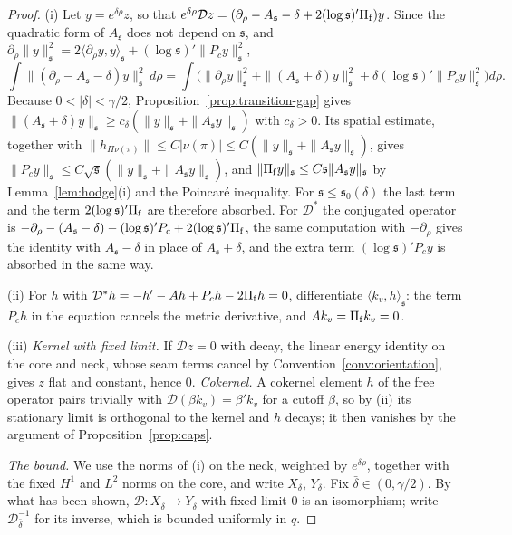 \documentclass[11pt]{amsart}
\theoremstyle{definition}
\theoremstyle{remark}
\theoremstyle{plain}
\numberwithin{equation}{section}
\begin{document}
\begin{proof}
(i) Let $y=e^{\delta\rho}z$, so that
$e^{\delta\rho}\mathcal Dz=(\partial_\rho-A_{\mathfrak s}-\delta+2(\log{\mathfrak s})'\Pi_{\rm f})y$. Since the
quadratic form of $A_{\mathfrak s}$ does not depend on ${\mathfrak s}$, and
$\partial_\rho\|y\|_{\mathfrak s}^2=2\langle\partial_\rho y,y\rangle_{\mathfrak s}+(\log{\mathfrak s})'\|P_cy\|_{\mathfrak s}^2$,
\[
\int\|(\partial_\rho-A_{\mathfrak s}-\delta)y\|_{\mathfrak s}^2\,d\rho
=\int\bigl(\|\partial_\rho y\|_{\mathfrak s}^2+\|(A_{\mathfrak s}+\delta)y\|_{\mathfrak s}^2
+\delta(\log{\mathfrak s})'\|P_cy\|_{\mathfrak s}^2\bigr)d\rho .
\]
Because $0<|\delta|<\gamma/2$, Proposition~\ref{prop:transition-gap} gives
$\|(A_{\mathfrak s}+\delta)y\|_{\mathfrak s}\ge c_\delta(\|y\|_{\mathfrak s}+\|A_{\mathfrak s} y\|_{\mathfrak s})$ with $c_\delta>0$.
Its spatial estimate, together with $\|h_{\Pi\nu(\pi)}\|\le C|\nu(\pi)|\le
C(\|y\|_{\mathfrak s}+\|A_{\mathfrak s} y\|_{\mathfrak s})$, gives $\|P_cy\|_{\mathfrak s}\le
C\sqrt{\mathfrak s}(\|y\|_{\mathfrak s}+\|A_{\mathfrak s} y\|_{\mathfrak s})$, and $\|\Pi_{\rm f}y\|_{\mathfrak s}\le C{\mathfrak s}\|A_{\mathfrak s} y\|_{\mathfrak s}$
by Lemma~\ref{lem:hodge}(i) and the Poincaré inequality. For ${\mathfrak s}\le{\mathfrak s}_0(\delta)$ the last term and the term $2(\log{\mathfrak s})'\Pi_{\rm f}$ are therefore absorbed. For $\mathcal D^*$ the conjugated
operator is $-\partial_\rho-(A_{\mathfrak s}-\delta)-(\log{\mathfrak s})'P_c+2(\log{\mathfrak s})'\Pi_{\rm f}$, the same
computation with $-\partial_\rho$ gives the identity with $A_{\mathfrak s}-\delta$ in place of
$A_{\mathfrak s}+\delta$, and the extra term $(\log{\mathfrak s})'P_cy$ is absorbed in the same way.

(ii) For $h$ with $\mathcal D^*h=-h'-Ah+P_ch-2\Pi_{\rm f}h=0$, differentiate
$\langle k_v,h\rangle_{\mathfrak s}$: the term $P_ch$ in the equation cancels the metric
derivative, and $Ak_v=\Pi_{\rm f}k_v=0$.

(iii) \emph{Kernel with fixed limit.} If $\mathcal Dz=0$ with decay, the linear
energy identity on the core and neck, whose seam terms cancel by
Convention~\ref{conv:orientation}, gives $z$ flat and constant, hence $0$.
\emph{Cokernel.} A cokernel element $h$ of the free operator pairs trivially
with $\mathcal D(\beta k_v)=\beta'k_v$ for a cutoff $\beta$, so by (ii) its stationary
limit is orthogonal to the kernel and $h$ decays; it then vanishes by the
argument of Proposition~\ref{prop:caps}. 

\emph{The bound.} We use the norms of (i) on the neck, weighted by $e^{\delta\rho}$,
together with the fixed $H^1$ and $L^2$ norms on the core, and write $X_\delta$,
$Y_\delta$. Fix $\bar\delta\in(0,\gamma/2)$. By what has been shown, $\mathcal D\colon
X_{\bar\delta}\to Y_{\bar\delta}$ with fixed limit $0$ is an isomorphism; write
$\mathcal D^{-1}_{\bar\delta}$ for its inverse, which is bounded uniformly in $q$.


\end{proof}
\end{document}

